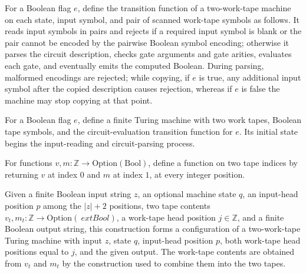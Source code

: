\begin{definition}
\label{BoolCircuit.CircuitEval.tr}
\leanok
{}
For a Boolean flag $e$, define the transition function of a two-work-tape machine on
each state, input symbol, and pair of scanned work-tape symbols as follows. It reads
input symbols in pairs and rejects if a required input symbol is blank or the pair
cannot be encoded by the pairwise Boolean symbol encoding; otherwise it parses the
circuit description, checks gate arguments and gate arities, evaluates each gate, and
eventually emits the computed Boolean. During parsing, malformed encodings are rejected;
while copying, if $e$ is true, any additional input symbol after the copied description
causes rejection, whereas if $e$ is false the machine may stop copying at that point.
\end{definition}

\begin{definition}
\label{BoolCircuit.CircuitEval.evalTM}
\leanok
{}
For a Boolean flag $e$, define a finite Turing machine with two work tapes, Boolean tape
symbols, and the circuit-evaluation transition function for $e$. Its initial state
begins the input-reading and circuit-parsing process.
\end{definition}

\begin{definition}
\label{BoolCircuit.CircuitEval.Internal.tp}
\leanok
For functions $v,m:\mathbb{Z}\to\mathrm{Option}(\mathrm{Bool})$, define a function on
two tape indices by returning $v$ at index $0$ and $m$ at index $1$, at every integer
position.
\end{definition}

\begin{definition}
\label{BoolCircuit.CircuitEval.Internal.cf}
\leanok
{}
Given a finite Boolean input string $z$, an optional machine state $q$, an input-head
position $p$ among the $|z|+2$ positions, two tape contents
$v_t,m_t:\mathbb{Z}\to\mathrm{Option}(\	ext{Bool})$, a work-tape head position
$j\in\mathbb{Z}$, and a finite Boolean output string, this construction forms a
configuration of a two-work-tape Turing machine with input $z$, state $q$, input-head
position $p$, both work-tape head positions equal to $j$, and the given output. The
work-tape contents are obtained from $v_t$ and $m_t$ by the construction used to combine
them into the two tapes.
\end{definition}

